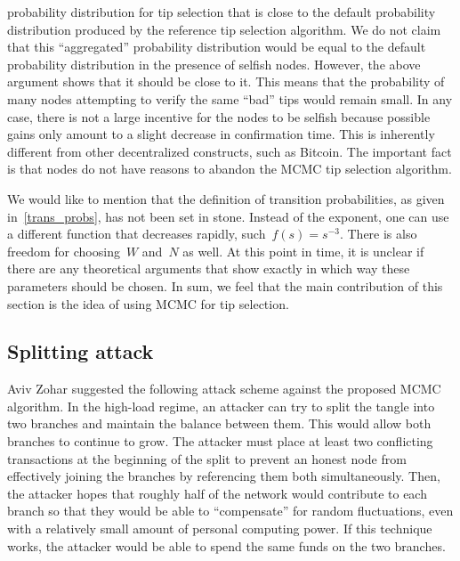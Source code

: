 \documentclass[12pt]{article}
\begin{document}
probability distribution for tip selection that is close to
 the default probability distribution produced
by the reference tip selection algorithm.
We do not claim that this ``aggregated'' probability
distribution
would be equal to the default probability distribution in the presence of selfish nodes. 
However, the above argument shows that it should be close to it.
This means that the probability of many nodes attempting 
to verify the same ``bad'' tips would remain small. 
In any case, 
there is not a large incentive for the nodes to be selfish 
because possible gains only amount to a slight decrease 
in confirmation time. This is inherently different from other 
decentralized constructs, such as Bitcoin. The important 
fact is that nodes do not have reasons to abandon the
 MCMC tip selection algorithm.


We would like to mention that the definition of transition 
probabilities, as given in~\eqref{trans_probs}, has not been 
set in stone.
Instead of the exponent, one can use a different function 
that decreases rapidly, such~$f(s)=s^{-3}$. 
There is also freedom for choosing~$W$ and~$N$ as well.
At this point in time, it is unclear if there are any theoretical 
arguments that show exactly in which way these parameters 
should be chosen. In sum, we feel that the main contribution 
of this section is the idea of using MCMC for tip selection.

\subsection{Splitting attack}
\label{s_splitting}
Aviv Zohar suggested the following attack scheme against the 
proposed MCMC algorithm.
In the high-load regime, 
an attacker can try to split the tangle into two branches 
 and maintain the balance between them.
This would allow both branches to continue to grow.  
The attacker must place at least 
two conflicting transactions at the beginning of the split to prevent an honest node from effectively joining the branches 
by referencing them both simultaneously.
Then, the attacker hopes that roughly half of the network would
contribute to each branch so that they 
would be able to ``compensate'' for random fluctuations,
even with a relatively small amount of personal computing power. 
If this technique works, the attacker would be able to spend the same
funds on the two branches.
\end{document}
